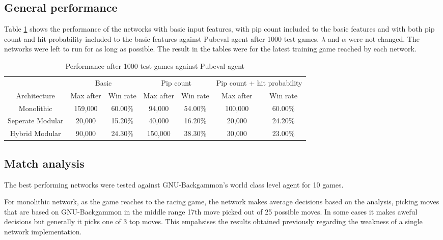 \documentclass[12pt,a4paper]{article}
\begin{document}
\subsection{General performance}
Table \ref{perf1} shows the performance of the networks with basic input features, with pip count included to the basic features and with both pip count and hit probability included to the basic features against Pubeval agent after 1000 test games. $\lambda$ and $\alpha$ were not changed. The networks were left to run for as long as possible. The result in the tables were for the latest training game reached by each network. 
\begin{table}[htb]
    \centering
    \caption{Performance after 1000 test games against Pubeval agent}
    \label{perf1}
    \begin{tabular}{c|cc|cc|cc}
        \hline
        \hline
        & \multicolumn{2}{|c|}{Basic} & \multicolumn{2}{|c|}{Pip count} & \multicolumn{2}{|c}{Pip count + hit probability} \\
        Architecture & Max after & Win rate & Max after & Win rate & Max after & Win rate \\ 
        \hline
        Monolithic & 159,000 & 60.00\% & 94,000 & 54.00\% & 100,000 & 60.00\% \\ 
        \hline
        Seperate Modular & 20,000 & 15.20\% & 40,000 & 16.20\%  & 20,000 & 24.20\% \\ 
        \hline
        Hybrid Modular & 90,000 & 24.30\% & 150,000 & 38.30\% & 30,000 & 23.00\% \\ 
        \hline
    \end{tabular}
\end{table}


\subsection{Match analysis}
The best performing networks were tested against GNU-Backgammon's world class level agent for 10 games. 

For monolithic network, as the game reaches to the racing game, the network makes average decisions based on the analysis, picking moves that are based on GNU-Backgammon in the middle range 17th move picked out of 25 possible moves. In some cases it makes aweful decisions but generally it picks one of 3 top moves. This empahsises the results obtained previously regarding the weakness of a single network implementation.
\end{document}
